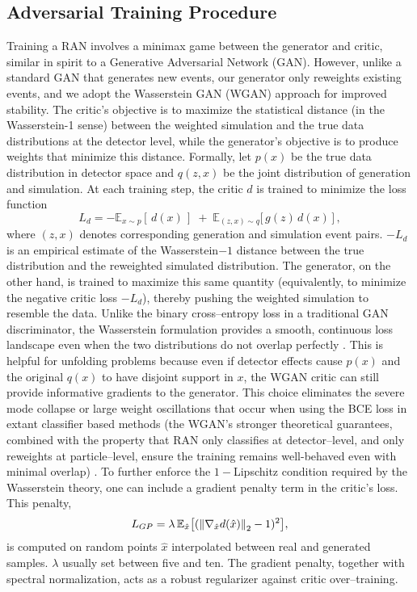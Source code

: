     \subsection{Adversarial Training Procedure}
        Training a RAN involves a minimax game between the generator and critic, similar in spirit to a Generative Adversarial Network (GAN).
        However, unlike a standard GAN that generates new events, our generator only reweights existing events, and we adopt the Wasserstein GAN (WGAN) approach  for improved stability.
        The critic’s objective is to maximize the statistical distance (in the Wasserstein-1 sense) between the weighted simulation and the true data distributions at the detector level, while the generator’s objective is to produce weights that minimize this distance.
        Formally, let $p(x)$ be the true data distribution in detector space and $q(z, x)$ be the joint distribution of generation and simulation.
        At each training step, the critic $d$ is trained to minimize the loss function
        \[
            L_d = -\mathbb{E}_{x\sim p}[\,d(x)\,]\;+\;\mathbb{E}_{(z, x)\sim q}\big[\,g(z)\,d(x)\,\big]\,,
            \label{eq:wgan_loss}
        \]
        where $(z, x)$ denotes corresponding generation and simulation event pairs.
        $-L_d$ is an empirical estimate of the Wasserstein\(-1\) distance between the true distribution and the reweighted simulated distribution.
        The generator, on the other hand, is trained to maximize this same quantity (equivalently, to minimize the negative critic loss $-L_d$), thereby pushing the weighted simulation to resemble the data.
        Unlike the binary cross--entropy loss in a traditional GAN discriminator, the Wasserstein formulation provides a smooth, continuous loss landscape even when the two distributions do not overlap perfectly .
        This is helpful for unfolding problems because even if detector effects cause $p(x)$ and the original $q(x)$ to have disjoint support in $x$, the WGAN critic can still provide informative gradients to the generator.
        This choice eliminates the severe mode collapse or large weight oscillations that occur when using the BCE loss in extant classifier based methods (the WGAN’s stronger theoretical guarantees, combined with the property that RAN only classifies at detector--level, and only reweights at particle--level, ensure the training remains well-behaved even with minimal overlap) .
        To further enforce the \(1-\)Lipschitz condition required by the Wasserstein theory, one can include a gradient penalty term  in the critic’s loss.
        This penalty,
        \[
            L_{GP} = \lambda\,\mathbb{E}_{\hat{x}}\qty[(\norm{\nabla_{\hat{x}}d(\hat{x})}_2 - 1)^2],
        \]
        is computed on random points $\hat{x}$ interpolated between real and generated samples.
        $\lambda$ usually set between five and ten.
        The gradient penalty, together with spectral normalization, acts as a robust regularizer against critic over--training.

